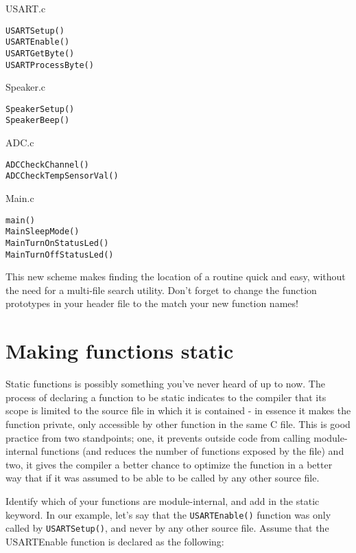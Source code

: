 \documentclass[a4paper,oneside,notitlepage]{article}
\begin{document}
USART.c
\begin{center}
\begin{lstlisting}
USARTSetup()
USARTEnable()
USARTGetByte()
USARTProcessByte()
\end{lstlisting}
\end{center}

Speaker.c
\begin{center}
\begin{lstlisting}
SpeakerSetup()
SpeakerBeep()
\end{lstlisting}
\end{center}

ADC.c
\begin{center}
\begin{lstlisting}
ADCCheckChannel()
ADCCheckTempSensorVal()
\end{lstlisting}
\end{center}

Main.c
\begin{center}
\begin{lstlisting}
main()
MainSleepMode()
MainTurnOnStatusLed()
MainTurnOffStatusLed()
\end{lstlisting}
\end{center}

This new scheme makes finding the location of a routine quick and easy, without the need for a multi-file search utility. Don't forget to change the function prototypes in your header file to the match your new function names!

\section{Making functions static}

Static functions is possibly something you've never heard of up to now. The process of declaring a function to be static indicates to the compiler that its scope is limited to the source file in which it is contained - in essence it makes the function private, only accessible by other function in the same C file. This is good practice from two standpoints; one, it prevents outside code from calling module-internal functions (and reduces the number of functions exposed by the file) and two, it gives the compiler a better chance to optimize the function in a better way that if it was assumed to be able to be called by any other source file.

Identify which of your functions are module-internal, and add in the static keyword. In our example, let's say that the \texttt{USARTEnable()} function was only called by \texttt{USARTSetup()}, and never by any other source file. Assume that the USARTEnable function is declared as the following:
\end{document}

